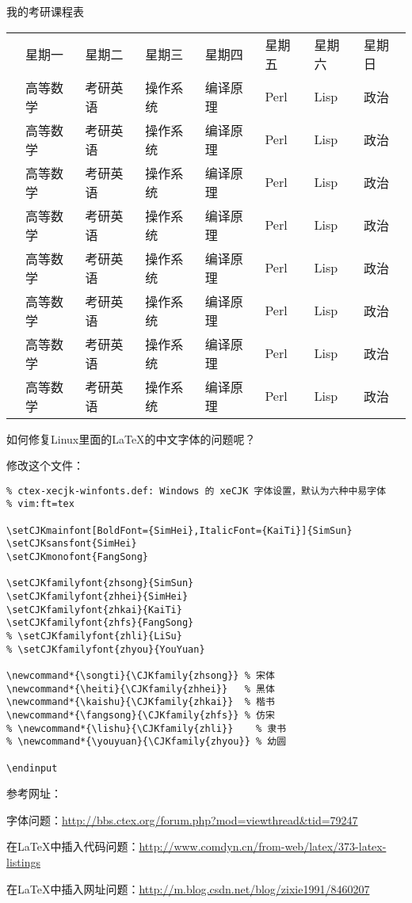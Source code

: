 \documentclass{ctexart}
\begin{document}
我的考研课程表

\begin{tabular}{@{}*{8}{l}@{}}
\toprule[1.5pt]
 & 星期一 & 星期二 & 星期三 & 星期四 & 星期五 & 星期六 & 星期日 \\
\cmidrule{2-8}
 & 高等数学 & 考研英语 & 操作系统 & 编译原理 & Perl & Lisp & 政治\\
 & 高等数学 & 考研英语 & 操作系统 & 编译原理 & Perl & Lisp & 政治\\
 & 高等数学 & 考研英语 & 操作系统 & 编译原理 & Perl & Lisp & 政治\\

\cmidrule{2-8}
 & 高等数学 & 考研英语 & 操作系统 & 编译原理 & Perl & Lisp & 政治\\
 & 高等数学 & 考研英语 & 操作系统 & 编译原理 & Perl & Lisp & 政治\\
 & 高等数学 & 考研英语 & 操作系统 & 编译原理 & Perl & Lisp & 政治\\

\cmidrule{2-8}
 & 高等数学 & 考研英语 & 操作系统 & 编译原理 & Perl & Lisp & 政治\\
 & 高等数学 & 考研英语 & 操作系统 & 编译原理 & Perl & Lisp & 政治\\

\bottomrule[1.5pt]
\end{tabular}

\newpage

如何修复Linux里面的\LaTeX{}的中文字体的问题呢？

修改这个文件：

\begin{lstlisting}
% ctex-xecjk-winfonts.def: Windows 的 xeCJK 字体设置，默认为六种中易字体
% vim:ft=tex

\setCJKmainfont[BoldFont={SimHei},ItalicFont={KaiTi}]{SimSun}
\setCJKsansfont{SimHei}
\setCJKmonofont{FangSong}

\setCJKfamilyfont{zhsong}{SimSun}
\setCJKfamilyfont{zhhei}{SimHei}
\setCJKfamilyfont{zhkai}{KaiTi}
\setCJKfamilyfont{zhfs}{FangSong}
% \setCJKfamilyfont{zhli}{LiSu}
% \setCJKfamilyfont{zhyou}{YouYuan}

\newcommand*{\songti}{\CJKfamily{zhsong}} % 宋体
\newcommand*{\heiti}{\CJKfamily{zhhei}}   % 黑体
\newcommand*{\kaishu}{\CJKfamily{zhkai}}  % 楷书
\newcommand*{\fangsong}{\CJKfamily{zhfs}} % 仿宋
% \newcommand*{\lishu}{\CJKfamily{zhli}}    % 隶书
% \newcommand*{\youyuan}{\CJKfamily{zhyou}} % 幼圆

\endinput

\end{lstlisting}

参考网址：

字体问题：\url{http://bbs.ctex.org/forum.php?mod=viewthread&tid=79247}

在\LaTeX{}中插入代码问题：\url{http://www.comdyn.cn/from-web/latex/373-latex-listings}

在\LaTeX{}中插入网址问题：\url{http://m.blog.csdn.net/blog/zixie1991/8460207}
\end{document}
